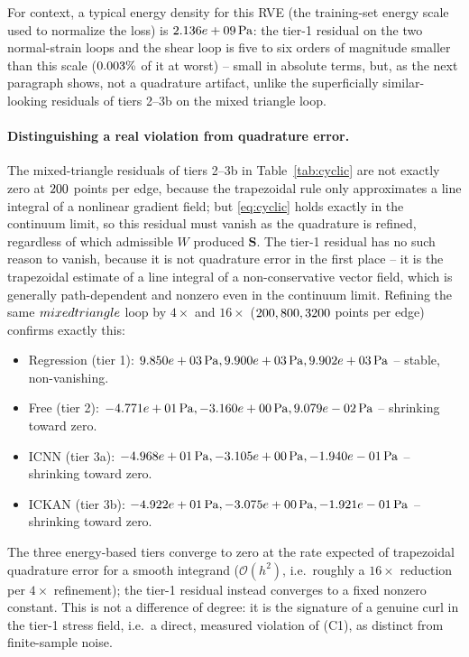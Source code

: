 \documentclass[10pt,a4paper]{article}
\begin{document}
For context, a typical energy density for this RVE (the training-set
energy scale used to normalize the loss) is $2.136e+09\,\mathrm{Pa}{}$: the
tier-1 residual on the two normal-strain loops and the shear loop is five
to six orders of magnitude smaller than this scale
($0.003\%{}$ of it at worst) -- small in absolute
terms, but, as the next paragraph shows, not a quadrature artifact, unlike
the superficially similar-looking residuals of tiers 2--3b on the mixed
triangle loop.

\paragraph{Distinguishing a real violation from quadrature error.} The
mixed-triangle residuals of tiers 2--3b in Table~\ref{tab:cyclic} are not
exactly zero at $200{}$ points per edge, because the
trapezoidal rule only approximates a line integral of a nonlinear
gradient field; but \eqref{eq:cyclic} holds exactly in the continuum
limit, so this residual must vanish as the quadrature is refined,
regardless of which admissible $W$ produced $\bm S$. The tier-1 residual
has no such reason to vanish, because it is not quadrature error in the
first place -- it is the trapezoidal estimate of a line integral of a
non-conservative vector field, which is generally path-dependent and
nonzero even in the continuum limit. Refining the same $mixed triangle{}$
loop by $4\times$ and $16\times$ ($200, 800, 3200{}$ points per edge)
confirms exactly this:
\begin{itemize}
 \item Regression (tier 1): $9.850e+03\,\mathrm{Pa}, 9.900e+03\,\mathrm{Pa}, 9.902e+03\,\mathrm{Pa}{}$ -- stable, non-vanishing.
 \item Free (tier 2): $-4.771e+01\,\mathrm{Pa}, -3.160e+00\,\mathrm{Pa}, 9.079e-02\,\mathrm{Pa}{}$ -- shrinking toward zero.
 \item ICNN (tier 3a): $-4.968e+01\,\mathrm{Pa}, -3.105e+00\,\mathrm{Pa}, -1.940e-01\,\mathrm{Pa}{}$ -- shrinking toward zero.
 \item ICKAN (tier 3b): $-4.922e+01\,\mathrm{Pa}, -3.075e+00\,\mathrm{Pa}, -1.921e-01\,\mathrm{Pa}{}$ -- shrinking toward zero.
\end{itemize}
The three energy-based tiers converge to zero at the rate expected of
trapezoidal quadrature error for a smooth integrand ($\mathcal
O(h^2)$, i.e.\ roughly a $16\times$ reduction per $4\times$ refinement);
the tier-1 residual instead converges to a fixed nonzero constant. This is
not a difference of degree: it is the signature of a genuine curl in the
tier-1 stress field, i.e.\ a direct, measured violation of (C1), as
distinct from finite-sample noise.
\end{document}
